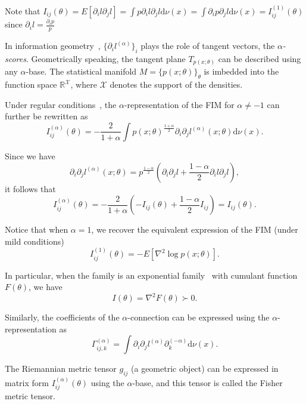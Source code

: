 \documentclass[11pt]{article}
\def\dnu{\mathrm{d}\nu}
\def\calX{\mathcal{X}}
\def\bbR{\mathbb{R}}
\begin{document}
Note that $I_{ij}(\theta)=E[\partial_i l\partial_j l]=\int p\partial_i l\partial_j l\dnu(x)=\int \partial_i p\partial_j l\dnu(x)=I_{ij}^{(1)}(\theta)$ since $\partial_i l=\frac{\partial_i p}{p}$

In information geometry~\cite{IG-2014}, $\{\partial_i l^{(\alpha)}\}_i$ plays the role of tangent vectors, the {\em $\alpha$-scores}.
Geometrically speaking, the tangent plane $T_{p(x;\theta)}$ can be described using any $\alpha$-base. 
The statistical manifold $M=\{p(x;\theta)\}_\theta$ is imbedded into the function space $\bbR^{\calX}$, where $\calX$ denotes the support of the densities.

Under regular conditions~\cite{CR-2013,IG-2014}, the $\alpha$-representation of the FIM for $\alpha\not=-1$ can further be rewritten as
\begin{equation}
I_{ij}^{(\alpha)}(\theta)=  -\frac{2}{1+\alpha} \int p(x;\theta)^{\frac{1+\alpha}{2}} \partial_i\partial_j l^{(\alpha)}(x;\theta)\dnu(x).
\end{equation}

Since we have 
$$
 \partial_i\partial_j l^{(\alpha)}(x;\theta) = p^{\frac{1-\alpha}{2}}\left(
\partial_i\partial_j l + \frac{1-\alpha}{2} \partial_i l\partial_j l
 \right),
$$
it follows that 
$$
I_{ij}^{(\alpha)}(\theta)= -\frac{2}{1+\alpha} \left(-I_{ij}(\theta)+ \frac{1-\alpha}{2} I_{ij}\right)=I_{ij}(\theta).
$$


Notice that when $\alpha=1$, we recover the equivalent expression of the FIM (under mild conditions)
$$
I_{ij}^{(1)}(\theta)= -E[\nabla^2 \log p(x;\theta)].
$$

In particular, when the family is an exponential family~\cite{EF-2009} with cumulant function $F(\theta)$, we have
$$
I(\theta)=\nabla^2 F(\theta)\succ 0.
$$

Similarly, the coefficients of the $\alpha$-connection can be expressed using the $\alpha$-representation as
$$
\Gamma_{ij,k}^{(\alpha)}= \int \partial_i\partial_j l^{(\alpha)}\partial_k^{(-\alpha)} \dnu(x).
$$

The Riemannian metric tensor $g_{ij}$ (a geometric object) can be expressed 
in matrix form $I_{ij}^{(\alpha)}(\theta)$ using the $\alpha$-base, and this tensor is called the Fisher metric tensor.
\end{document}
